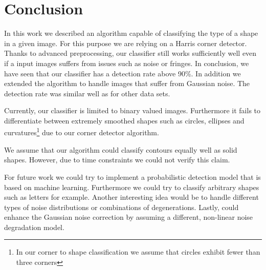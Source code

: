 \documentclass[conference]{IEEEtran}
\begin{document}
\section{Conclusion}
In this work we described an algorithm capable of classifying the type of a shape in a given image. For this purpose we are relying on a Harris corner detector. 
Thanks to advanced preprocessing, our classifier still works sufficiently well even if a input images suffers from issues such as noise or fringes. 
In conclusion, we have seen that our classifier has a detection rate above 90\%. 
In addition we extended the algorithm to handle images that suffer from Gaussian noise. 
The detection rate was similar well as for other data sets.

Currently, our classifier is limited to binary valued images. Furthermore it fails to differentiate between extremely smoothed shapes such as circles, ellipses and curvatures\footnote{In our corner to shape classification we assume that circles exhibit fewer than three corners} due to our corner detector algorithm.

We assume that our algorithm could classify contours equally well as solid shapes. 
However, due to time constraints we could not verify this claim.

For future work we could try to implement a probabilistic detection model that is based on machine learning. 
Furthermore we could try to classify arbitrary shapes such as letters for example. 
Another interesting idea would be to handle different types of noise distributions or combinations of degenerations. 
Lastly, could enhance the Gaussian noise correction by assuming a different, non-linear noise degradation model. 

%
%
\end{document}
